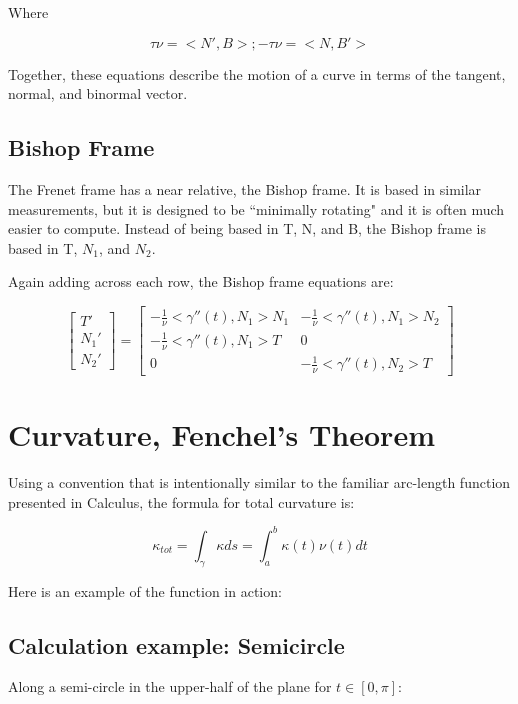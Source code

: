 \documentclass{article}
\begin{document}
 Where
 
 \[ \tau \nu = <N', B>; -\tau \nu = <N, B'> \]
 
 Together, these equations describe the motion of a curve in terms of the tangent, normal, and binormal vector.
 
 \subsection{Bishop Frame}
 
 The Frenet frame has a near relative, the Bishop frame. It is based in similar measurements, but it is designed to be ``minimally rotating" and it is often much easier to compute. Instead of being based in T, N, and B, the Bishop frame is based in T, $N_{1}$, and $N_{2}$.
 
 Again adding across each row, the Bishop frame equations are:
 
 \[ 
\begin{bmatrix}
T' \\
N_{1}' \\
N_{2}' 
\end{bmatrix}
=
\begin{bmatrix}
-\frac{1}{\nu}<\gamma''(t), N_{1}>N_{1} & -\frac{1}{\nu}<\gamma''(t), N_{1}>N_{2} \\
-\frac{1}{\nu}<\gamma''(t), N_{1}>T & 0\\
0 & -\frac{1}{\nu}<\gamma''(t), N_{2}>T
\end{bmatrix}
 \]
 
 
 \section{Curvature, Fenchel's Theorem}
 
Using a convention that is intentionally similar to the familiar arc-length function presented in Calculus, the formula for total curvature is:

\[\kappa_{tot} =  \int_{\gamma} \kappa ds = \int_{a}^{b} \kappa(t) \nu(t) dt\]

Here is an example of the function in action:

\subsection{Calculation example: Semicircle}

Along a semi-circle in the upper-half of the plane for $t\in[0,\pi]$:
\end{document}

